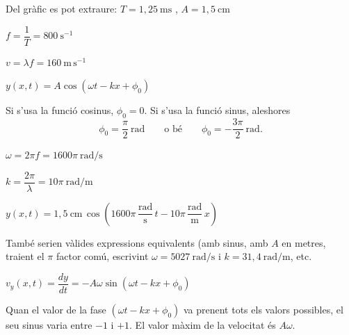 \begin{solapartat}

Del gràfic es pot extraure: $T = 1,25\ \mathrm{ms}$ , $A = 1,5\ \mathrm{cm}$ 

 $f = \dfrac{1}{T} = 800\ \mathrm{s^{-1}}$

 $v = \lambda f = 160\ \mathrm{m\,s^{-1}}$

 $y(x, t) = A\cos(\omega t - kx + \phi_0)$

Si s'usa la funció cosinus, $\phi_0 = 0$. Si s'usa la funció sinus, aleshores
\[ \phi_0 = \frac{\pi}{2}\ \mathrm{rad} \qquad \text{o bé} \qquad \phi_0 = -\frac{3\pi}{2}\ \mathrm{rad}. \]

 $\omega = 2\pi f = 1600\pi\ \mathrm{rad/s}$

 $k = \dfrac{2\pi}{\lambda} = 10\pi\ \mathrm{rad/m}$

 $y(x, t) = 1,5\ \mathrm{cm}\,\cos\left(1600\pi\,\dfrac{\mathrm{rad}}{\mathrm{s}}\,t - 10\pi\,\dfrac{\mathrm{rad}}{\mathrm{m}}\,x\right)$

També serien vàlides expressions equivalents (amb sinus, amb $A$ en metres, traient el $\pi$ factor comú, escrivint $\omega = 5027\ \mathrm{rad/s}$ i $k = 31,4\ \mathrm{rad/m}$, etc.
\end{solapartat}

\begin{solapartat}
 $v_y(x, t) = \dfrac{dy}{dt} = -A\omega\sin(\omega t - kx + \phi_0)$

 Quan el valor de la fase $(\omega t - kx + \phi_0)$ va prenent tots els valors possibles, el seu sinus varia entre $-1$ i $+1$. El valor màxim de la velocitat és $A\omega$.
\end{solapartat}
